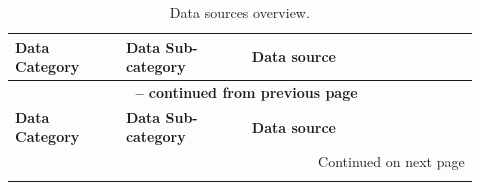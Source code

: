 \documentclass{article}
\begin{document}
\begin{longtable}{|p{0.22\linewidth}|p{0.25\linewidth}|p{0.45\linewidth}|}
    \caption{Data sources overview.} \label{tab:dataSources} \\
    \hline 
    \textbf{Data Category} & \textbf{Data Sub-category} & \textbf{Data source} \\ 
    \hline
    \endfirsthead

    \multicolumn{3}{c}{{\bfseries \tablename\ \thetable{} -- continued from previous page}} \\
    \hline 
    \textbf{Data Category} & \textbf{Data Sub-category} & \textbf{Data source} \\
    \hline 
    \endhead

    \hline \multicolumn{3}{|r|}{{Continued on next page}} \\ \hline
    \endfoot
    \hline
    \endlastfoot


\end{longtable}
\end{document}
